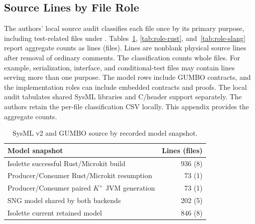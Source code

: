 \subsection{Source Lines by File Role}
\label{app:source-role-counts}
The authors' local source audit classifies each file once by its primary purpose, including test-related files under . Tables~\ref{tab:role-model}, \ref{tab:role-rust}, and~\ref{tab:role-slang} report aggregate counts as lines (files). Lines are nonblank physical source lines after removal of ordinary comments. The classification counts whole files. For example, serialization, interface, and conditional-test files may contain lines serving more than one purpose. The model rows include GUMBO contracts, and the implementation roles can include embedded contracts and proofs. The local audit tabulates shared SysML libraries and C/header support separately. The authors retain the per-file classification CSV locally. This appendix provides the aggregate counts.

\begin{table}[!htbp]
\caption{SysML v2 and GUMBO source by recorded model snapshot.}
\label{tab:role-model}
\centering\small
\setlength{\tabcolsep}{4pt}
\begin{tabular}{@{}>{\raggedright\arraybackslash}p{.68\linewidth}r@{}}
\toprule
Model snapshot & Lines (files) \\
\midrule
Isolette successful Rust/Microkit build & 936 (8) \\
Producer/Consumer Rust/Microkit resumption & 73 (1) \\
Producer/Consumer paired $K^{+}$ JVM generation & 73 (1) \\
SNG model shared by both backends & 202 (5) \\
Isolette current retained model & 846 (8) \\
\bottomrule
\end{tabular}
\end{table}

